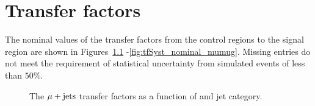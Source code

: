 \chapter{Transfer factors}
\label{app:nominal-tf}
The nominal values of the transfer factors from the control regions to the signal region are shown in Figures~\ref{fig:tfSyst_nominal_mu}
-\ref{fig:tfSyst_nominal_mumug}. Missing entries do not meet the requirement of statistical uncertainty from simulated
events of less than $50\%$.
\begin{figure}[!h]
  \centering

\caption{\label{fig:tfSyst_nominal_mu} The $\mu + \textrm{jets}$ transfer factors as a function of \scalht and jet category.}
\end{figure}

